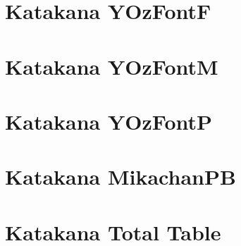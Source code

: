 \JapaneseDefault
\newpage\JapaneseYOzFontF\section{Katakana YOzFontF}
\JapaneseDefault
\newpage\JapaneseYOzFontM\section{Katakana YOzFontM}
\JapaneseDefault
\newpage\JapaneseYOzFontP\section{Katakana YOzFontP}
\JapaneseDefault
\newpage\JapaneseMikachanPB\section{Katakana MikachanPB}
\JapaneseDefault
\newpage\section{Katakana Total Table} 
